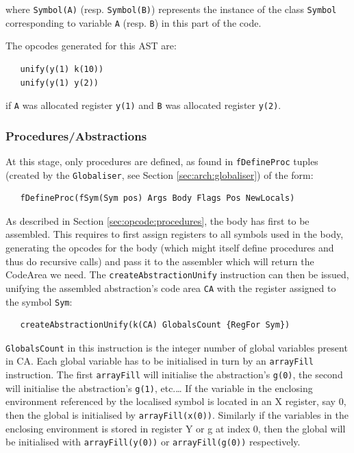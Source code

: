 \documentclass[a4paper]{memoir}
\begin{document}
where \lstinline!Symbol(A)! (resp. \lstinline!Symbol(B)!) represents the instance of the class \lstinline!Symbol! corresponding to variable \lstinline!A! (resp. \lstinline!B!) in this part of the code. 

The opcodes generated for this AST are:

\begin{lstlisting}
   unify(y(1) k(10))
   unify(y(1) y(2))
\end{lstlisting}
if \lstinline!A! was allocated register \lstinline!y(1)! and \lstinline!B! was
allocated register \lstinline!y(2)!.


\subsubsection{Procedures/Abstractions}\label{sec:codegen:procedures}
At this stage, only procedures are defined, as found in \lstinline!fDefineProc! tuples (created by the \lstinline!Globaliser!, see Section \ref{sec:arch:globaliser}) of the form:
\begin{lstlisting}
   fDefineProc(fSym(Sym pos) Args Body Flags Pos NewLocals)
\end{lstlisting}
As described in Section \ref{sec:opcode:procedures}, the body has first to be assembled. This requires to first assign registers to all symbols used in the body, generating the opcodes for the body (which might itself define procedures and thus do recursive calls) and pass it to the assembler which will return the CodeArea we need.
The \lstinline!createAbstractionUnify! instruction can then be issued, unifying the assembled abstraction's code area \lstinline!CA! with the register assigned to the symbol \lstinline!Sym!:
\begin{lstlisting}
   createAbstractionUnify(k(CA) GlobalsCount {RegFor Sym})
\end{lstlisting}
\lstinline!GlobalsCount! in this instruction is the integer number of global variables present in CA. Each global variable has to be initialised in turn by an \lstinline!arrayFill! instruction. The first \lstinline!arrayFill! will initialise the abstraction's \lstinline!g(0)!, the second will initialise the abstraction's \lstinline!g(1)!, etc.\ldots
If the variable in the enclosing environment referenced by the localised symbol
is located in an X register, say 0, then the global is initialised by
\lstinline!arrayFill(x(0))!. Similarly if the variables in the enclosing
environment is stored in register Y or g at index 0, then the global will be
initialised with \lstinline!arrayFill(y(0))! or \lstinline!arrayFill(g(0))! respectively.
\end{document}
